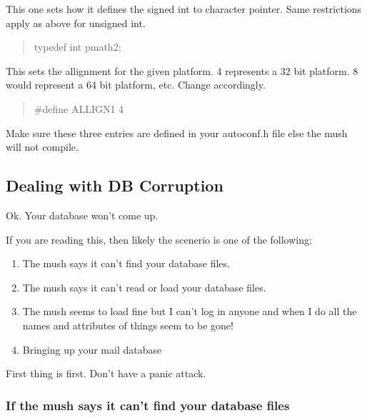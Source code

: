 \documentclass[letterpaper,10pt,english]{sphinxmanual}
\begin{document}
\sphinxAtStartPar
This one sets how it defines the signed int to character pointer.  Same
restrictions apply as above for unsigned int.
\begin{quote}

\sphinxAtStartPar
typedef int     pmath2;
\end{quote}

\sphinxAtStartPar
This sets the allignment for the given platform.  4 represents a 32 bit
platform.  8 would represent a 64 bit platform, etc.  Change accordingly.
\begin{quote}

\sphinxAtStartPar
\#define ALLIGN1 4
\end{quote}

\sphinxAtStartPar
Make sure these three entries are defined in your autoconf.h file else
the mush will not compile.


\subsection{Dealing with DB Corruption}
\label{\detokenize{troubleshooting:dealing-with-db-corruption}}
\sphinxAtStartPar
Ok.  Your database won’t come up.

\sphinxAtStartPar
If you are reading this, then likely the scenerio is one of the following:
\begin{enumerate}
%
\item {} 
\sphinxAtStartPar
The mush says it can’t find your database files.

\item {} 
\sphinxAtStartPar
The mush says it can’t read or load your database files.

\item {} 
\sphinxAtStartPar
The mush seems to load fine but I can’t log in anyone and when I do
all the names and attributes of things seem to be gone!

\item {} 
\sphinxAtStartPar
Bringing up your mail database

\end{enumerate}

\sphinxAtStartPar
First thing is first.  Don’t have a panic attack.


\subsubsection{If the mush says it can’t find your database files}
\label{\detokenize{troubleshooting:if-the-mush-says-it-can-t-find-your-database-files}}
\end{document}
